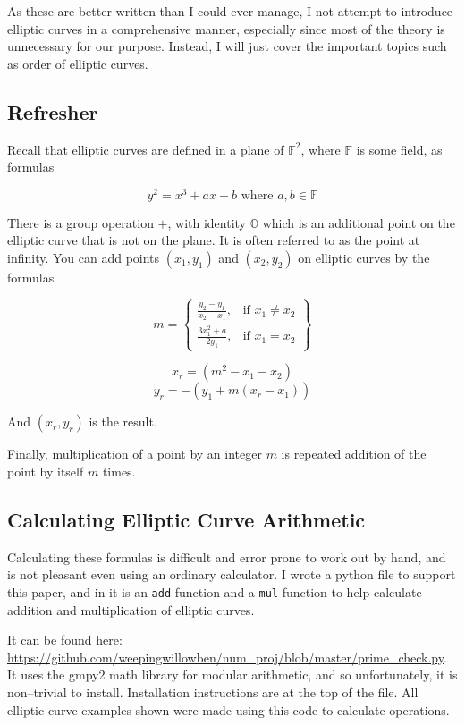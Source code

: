 \documentclass[]{article}
\newcommand{\OS}{\mathbb{O}}
\newcommand{\F}{\mathbb{F}}
\begin{document}
As these are better written than I could ever manage, I not attempt to introduce elliptic curves in a comprehensive manner, especially since most of the theory is unnecessary for our purpose. Instead, I will just cover the important topics such as order of elliptic curves.

\subsection{Refresher}

Recall that elliptic curves are defined in a plane of $\F^2$, where $\F$ is some field, as formulas

$$y^2 = x^3 + ax + b \text{ where }a, b \in \F$$

There is a group operation $+$, with identity $\OS$ which is an additional point on the elliptic curve that is not on the plane. It is often referred to as the point at infinity. You can add points $(x_1,y_1)$ and $(x_2,y_2)$ on elliptic curves by the formulas

\[
m = \left\{\begin{array}{lr}
\frac{y_2-y_1}{x_2-x_1}, & \text{if } x_1 \ne x_2 \\
\frac{3x_1^2+a}{2y_1}, & \text{if } x_1 = x_2
\end{array}\right\}
\]

$$x_r = (m^2-x_1 - x_2)$$
$$y_r = -(y_1 + m(x_r - x_1))$$

\noindent And $(x_r,y_r)$ is the result.

Finally, multiplication of a point by an integer $m$ is repeated addition of the point by itself $m$ times.

\subsection{Calculating Elliptic Curve Arithmetic}

Calculating these formulas is difficult and error prone to work out by hand, and is not pleasant even using an ordinary calculator. I wrote a python file to support this paper, and in it is an \texttt{add} function and a \texttt{mul} function to help calculate addition and multiplication of elliptic curves.

It can be found here: \url{https://github.com/weepingwillowben/num_proj/blob/master/prime_check.py}.
It uses the gmpy2 math library for modular arithmetic, and so unfortunately, it is non--trivial to install. Installation instructions are at the top of the file. All elliptic curve examples shown were made using this code to calculate operations.
\end{document}
